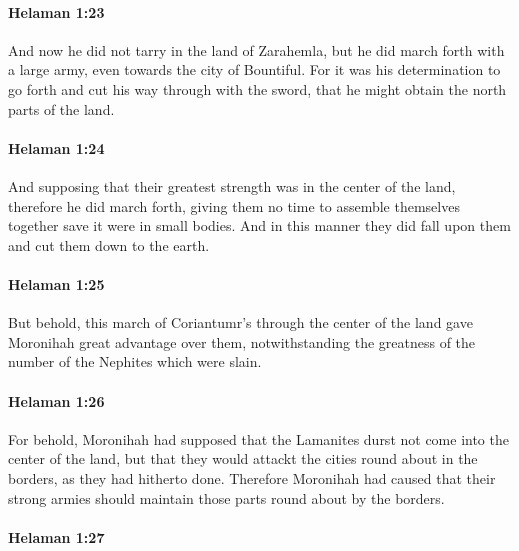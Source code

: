 		\paragraph{Helaman 1:23} %
			\label{HELAMAN-1-23}

			And now he did not tarry in the land of Zarahemla,
			but he did march forth with a large army, even towards the city of Bountiful.
			For it was his determination to go forth and cut his way through with the sword,
			that he might obtain the north parts of the land.

		\paragraph{Helaman 1:24} %
			\label{HELAMAN-1-24}

			And supposing that their greatest strength was in the center of the land,
			therefore he did march forth,
			giving them no time to assemble themselves together save it were in small bodies.
			And in this manner they did fall upon them and cut them down to the earth.

		\paragraph{Helaman 1:25} %
			\label{HELAMAN-1-25}

			But behold, this march of Coriantumr's through the center of the land
			gave Moronihah great advantage over them,
			notwithstanding the greatness of the number of the Nephites which were slain.

		\paragraph{Helaman 1:26} %
			\label{HELAMAN-1-26}

			For behold, Moronihah had supposed
			that the Lamanites durst not come into the center of the land,
			but that they would attackt the cities round about in the borders,
			as they had hitherto done.
			Therefore Moronihah had caused
			that their strong armies should maintain those parts round about by the borders.

		\paragraph{Helaman 1:27} %
			\label{HELAMAN-1-27}

